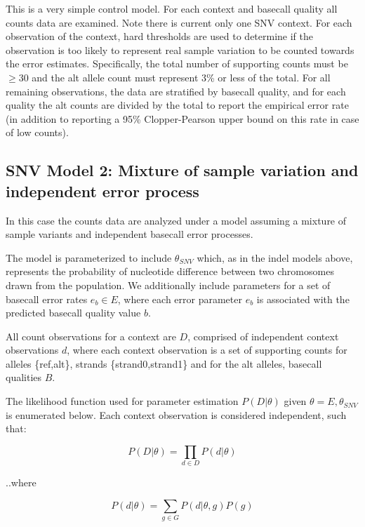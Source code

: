 \documentclass{article}
\begin{document}
This is a very simple control model. For each context and basecall quality all counts data are examined. Note there is current only one SNV context. For each observation of the context, hard thresholds are used to determine if the observation is too likely to represent real sample variation to be counted towards the error estimates. Specifically, the total number of supporting counts must be $\geq 30$ and the alt allele count must represent 3\% or less of the total. For all remaining observations, the data are stratified by basecall quality, and for each quality the alt counts are divided by the total to report the empirical error rate (in addition to reporting a 95\% Clopper-Pearson upper bound on this rate in case of low counts).

\subsection{SNV Model 2: Mixture of sample variation and independent error process}

In this case the counts data are analyzed under a model assuming a mixture of sample variants and independent basecall error processes.

The model is parameterized to include $\theta_{SNV}$ which, as in the indel models above, represents the probability of nucleotide difference between two chromosomes drawn from the population. We additionally include parameters for a set of basecall error rates $e_b \in E$, where each error parameter $e_b$ is associated with the predicted basecall quality value $b$.

All count observations for a context are $D$, comprised of independent context observations $d$, where each context observation is a set of supporting counts for alleles \{ref,alt\}, strands \{strand0,strand1\} and for the alt alleles, basecall qualities $B$.

The likelihood function used for parameter estimation $P( D \vert \theta )$ given $\theta = {E,\theta_{SNV}}$ is enumerated below. Each context observation is considered independent, such that:

\begin{equation}
\label{eq:snv_m2}
P(D \vert \theta) = \prod_{d \in D} P(d \vert \theta)
\end{equation}

..where

\begin{equation*}
P(d \vert \theta) = \sum_{g \in G} P(d \vert\theta, g) P(g)
\end{equation*}
\end{document}
